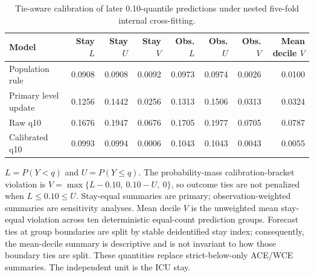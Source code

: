 \begin{table}[!htbp]
\caption{Tie-aware calibration of later 0.10-quantile predictions under nested five-fold internal cross-fitting.}
\label{tab:tie_aware_calibration_summary}
\centering
\scriptsize
\begin{tabular}{lrrrrrrr}
\hline
Model & Stay $L$ & Stay $U$ & Stay $V$ & Obs. $L$ & Obs. $U$ & Obs. $V$ & Mean decile $V$\\
\hline
Population rule & 0.0908 & 0.0908 & 0.0092 & 0.0973 & 0.0974 & 0.0026 & 0.0100\\
Primary level update & 0.1256 & 0.1442 & 0.0256 & 0.1313 & 0.1506 & 0.0313 & 0.0324\\
Raw q10 & 0.1676 & 0.1947 & 0.0676 & 0.1705 & 0.1977 & 0.0705 & 0.0787\\
Calibrated q10 & 0.0993 & 0.0994 & 0.0006 & 0.1043 & 0.1043 & 0.0043 & 0.0055\\
\hline
\end{tabular}
\par\smallskip
\footnotesize{$L=P(Y<q)$ and $U=P(Y\le q)$. The probability-mass calibration-bracket violation is $V=\max\{L-0.10,\ 0.10-U,\ 0\}$, so outcome ties are not penalized when $L\le0.10\le U$. Stay-equal summaries are primary; observation-weighted summaries are sensitivity analyses. Mean decile $V$ is the unweighted mean stay-equal violation across ten deterministic equal-count prediction groups. Forecast ties at group boundaries are split by stable deidentified stay index; consequently, the mean-decile summary is descriptive and is not invariant to how those boundary ties are split. These quantities replace strict-below-only ACE/WCE summaries. The independent unit is the ICU stay.}
\end{table}
